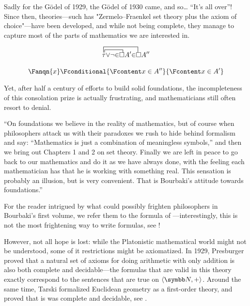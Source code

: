 Sadly for the Gödel of 1929, the Gödel of 1930 came, and so… ``It's all over''!
Since then, theories---such has
"Zermelo–Fraenkel set theory plus the axiom of choice"---have been developed, and while not being complete, they 
manage to capture most of the parts of mathematics we are interested in.%
\begin{marginfigure}[-8em]
	\centering
	\[
	\contraction{}{\tau\,}{{\vee} {\neg} {\in}}{\!\square}
	\contraction[2ex]{}{\tau\!}{{\vee} {\neg} {\in} \square A' {\in}}{\square}
	\tau {\vee} {\neg} {\in} \square A' {\in} \square A''
	\]
	\caption{\AP\label{fig:intro-bourbaki}
	The "first-order sentence" $\exists x.\, (x \not\in A') \lor (x \in A'')$
	as written by Bourbaki in \cite[\S~1]{Bourbaki2006Logique}.
	}
\end{marginfigure}
\begin{marginfigure}
	\centering
	\[
		\Fanqn{x}\Fconditional{\Fcontent x \in A''}{\Fcontent x \in A'}
	\]
	\caption{\AP\label{fig:intro-frege}
		The "first-order sentence" of 
		written using Frege's notations (1879).
	}
\end{marginfigure}
Yet, after half a century of efforts to build solid foundations,
the incompleteness of this consolation prize is actually frustrating,
and mathematicians still often resort to denial.
\begin{displayquote}
	``On foundations we believe in the reality of mathematics, but of course when philosophers attack us with their paradoxes we rush to hide behind formalism and say: ``Mathematics is just a combination of meaningless symbols,'' and then we bring out Chapters 1 and 2 on set theory. Finally we are left in peace to go back to our mathematics and do it as we have always done, with the feeling each mathematician has that he is working with something real.
	This sensation is probably an illusion, but is very convenient. That is Bourbaki's attitude towards foundations.''
\end{displayquote}
For the reader intrigued by what could possibly frighten philosophers in Bourbaki's first volume,
we refer them to the formula of ---interestingly, this is not the most 
frightening way to write formulas, see !

However, not all hope is lost: while the Platonistic mathematical world might
not be understood, some of it restrictions might be axiomatized.
In 1929, Presburger proved that a natural set of axioms for doing
arithmetic with only addition is also both complete and decidable---the formulas
that are valid in this theory exactly correspond to the sentences that are true on $\tup{\N,+}$.
Around the same time, Tarski formalized Euclidean geometry as a first-order theory, and proved
that is was complete and decidable, see \cite{TarskiGivant1999Geometry}.

